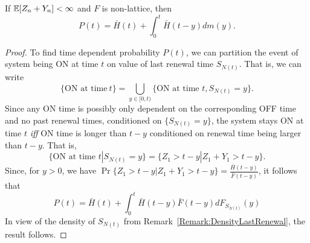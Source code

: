 \documentclass[a4paper,10pt,english]{article}
\begin{document}
\begin{thm}[ON Probability] \label{Thm:OnProbability}
If $\mathbb{E}[Z_n+Y_n]< \infty $ and $F$ is non-lattice, then
\begin{equation*}
P(t) = \bar{H}(t)+\int_{0}^{t}\bar{H}(t-y)dm(y).
\end{equation*}
\end{thm} 
\begin{proof} To find time dependent probability $P(t)$, we can partition the event of system being ON at time $t$ on value of last renewal time $S_{N(t)}$. That is, we can write
\begin{equation*}
\{\text{ON at time}~ t\} =\bigcup_{y \in [0, t)}\{\text{ON at time } t, S_{N(t)} = y\}.%
\end{equation*}
Since any ON time is possibly only dependent on the corresponding OFF time and no past renewal times, conditioned on $\{S_{N(t)} = y \}$, the system stays ON at time $t$ \emph{iff} ON time is longer than $t-y$ conditioned on renewal time being larger than $t-y$. That is, 
\begin{equation*}
\{\text{ON at time } t| S_{N(t)} = y\} =\{Z_1 > t - y| Z_1 + Y_1 > t-y\}.
\end{equation*}
Since, for $y>0$, we have $\Pr\{Z_1 > t - y| Z_1 + Y_1 > t-y\} = \frac{\bar{H}(t-y)}{\bar{F}(t-y)}$, it follows that
\begin{equation*}
P(t) = \bar{H}(t)+ \int_{0}^t {\bar{H}(t-y)}{\bar{F}(t-y)}dF_{S_{N(t)}}(y)
\end{equation*}
In view of the density of $S_{N(t)}$ from Remark~\ref{Remark:DensityLastRenewal}, the result follows.
\end{proof}
\end{document}
